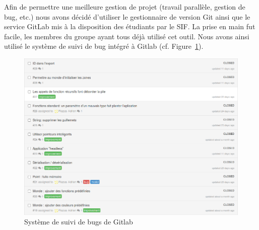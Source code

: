 Afin de permettre une meilleure gestion de projet (travail parallèle, gestion de bug, etc.) nous avons décidé d'utiliser le gestionnaire de version Git ainsi que le service GitLab mis à la disposition des étudiants par le SIF.
La prise en main fut facile, les membres du groupe ayant tous déjà utilisé cet outil. Nous avons ainsi utilisé le système de suivi de bug intégré à Gitlab (cf. Figure~\ref{bugs}).

\begin{figure}[h]
\centering
\includegraphics[scale=0.35]{doc/gestionProjet/bugs.png}
\caption{\label{bugs} Système de suivi de bugs de Gitlab}
\end{figure}


